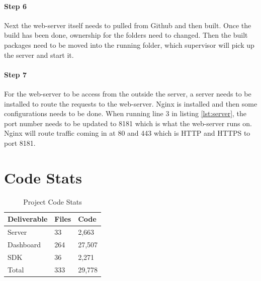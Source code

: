 \paragraph{Step 6}
Next the web-server itself needs to pulled from Github and then built. Once the build has been done, ownership for the folders need to changed. Then the built packages need to be moved into the running folder, which supervisor will pick up the server and start it.


\paragraph{Step 7}
For the web-server to be access from the outside the server, a server needs to be installed to route the requests to the web-server. Nginx is installed and then some configurations needs to be done. When running line 3 in listing \ref{lst:server}, the port number needs to be updated to 8181 which is what the web-server runs on. Nginx will route traffic coming in at 80 and 443 which is HTTP and HTTPS to port 8181.



\section{Code Stats}

\begin{table}[!h]
\centering
\caption{Project Code Stats}
\label{my-label}
\begin{tabular}{|l|l|l|}
\hline
\rowcolor{green!20}
Deliverable & Files & Code   \\ \hline
Server      & 33    & 2,663  \\ \hline
Dashboard   & 264   & 27,507 \\ \hline
SDK         & 36    & 2,271  \\ \hline
Total       & 333   & 29,778 \\ \hline
\end{tabular}
\end{table}